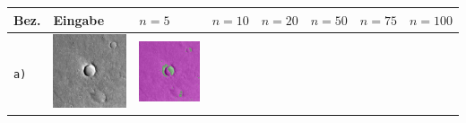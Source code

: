 \begin{table}[h!]
	\setlength\tabcolsep{0pt}
	\begin{tabularx}{\textwidth}{>{\centering}m{}
			>{\centering}m{}
			>{\centering}m{}
			>{\centering}m{}
			>{\centering}m{}
			>{\centering}m{}
			>{\centering}m{}
			>{\centering\arraybackslash}m{}}
		\toprule
		Bez. &
		Eingabe & 
		$n=5$ &
		$n=10$ &
		$n=20$ &
		$n=50$ &
		$n=75$ &
		$n=100$ \\
		\midrule
		\texttt{a)} &
		\includegraphics[width=0.9\linewidth]{images/p03/p03_01.png} &
		\includegraphics[width=0.9\linewidth]{images/gen/number_of_segments/p03_01.png_5.png} &

\end{tabularx}
\end{table}
